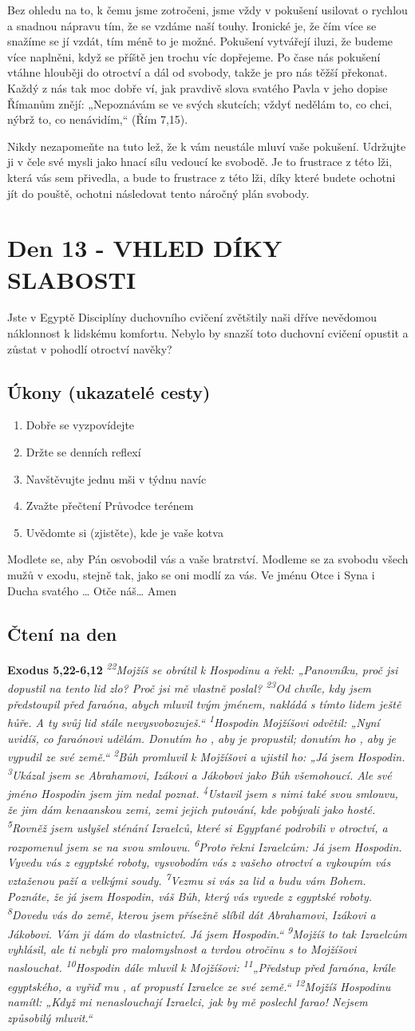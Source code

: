\documentclass[11pt]{article}
\newcommand{\zacatekDruhyTyden}{
  Jste v Egyptě \newline
  Disciplíny duchovního cvičení zvětštily naši dříve nevědomou náklonnost k lidskému komfortu.
  Nebylo by snazší toto duchovní cvičení opustit a zůstat v pohodlí otroctví navěky?

  \subsection*{Úkony (ukazatelé cesty)}
\begin{enumerate}
  \item Dobře se vyzpovídejte
  \item Držte se denních reflexí
  \item Navštěvujte jednu mši v týdnu navíc
  \item Zvažte přečtení Průvodce terénem
  \item Uvědomte si (zjistěte), kde je vaše kotva
\end{enumerate}
Modlete se, aby Pán osvobodil vás a vaše bratrství. \newline
Modleme se za svobodu všech mužů v exodu, stejně tak, jako se oni modlí za vás.\newline
Ve jménu Otce i Syna i Ducha svatého …  Otče náš… Amen
}
\begin{document}
Bez ohledu na to, k čemu jsme zotročeni, jsme vždy v pokušení usilovat o rychlou a snadnou nápravu tím, že se
vzdáme naší touhy. Ironické je, že čím více se snažíme se jí vzdát, tím méně to je možné. Pokušení vytvářejí iluzi,
že budeme více naplněni, když se příště jen trochu víc dopřejeme. Po čase nás pokušení vtáhne hlouběji do otroctví
a dál od svobody, takže je pro nás těžší překonat. Každý z nás tak moc dobře ví, jak pravdivě slova svatého Pavla v
jeho dopise Římanům znějí: „Nepoznávám se ve svých skutcích; vždyť nedělám to, co chci, nýbrž to, co
nenávidím,“ (Řím 7,15).

Nikdy nezapomeňte na tuto lež, že k vám neustále mluví vaše pokušení. Udržujte ji v čele své mysli jako hnací sílu
vedoucí ke svobodě. Je to frustrace z této lži, která vás sem přivedla, a bude to frustrace z této lži, díky které budete
ochotni jít do pouště, ochotni následovat tento náročný plán svobody.

\newpage
\section{Den 13 - VHLED DÍKY SLABOSTI}
\zacatekDruhyTyden
\subsection*{Čtení na den}
\textbf{Exodus 5,22-6,12}
\newline
\textit{
\textsuperscript{22}Mojžíš se obrátil k Hospodinu a řekl: „Panovníku, proč jsi dopustil na tento lid zlo? Proč jsi mě vlastně poslal?
\textsuperscript{23}Od chvíle, kdy jsem předstoupil před faraóna, abych mluvil tvým jménem, nakládá s tímto lidem ještě hůře. A ty svůj lid stále nevysvobozuješ.“
\textsuperscript{1}Hospodin Mojžíšovi odvětil: „Nyní uvidíš, co faraónovi udělám. Donutím ho , aby je propustil; donutím ho , aby je vypudil ze své země.“
\textsuperscript{2}Bůh promluvil k Mojžíšovi a ujistil ho: „Já jsem Hospodin.
\textsuperscript{3}Ukázal jsem se Abrahamovi, Izákovi a Jákobovi jako Bůh všemohoucí. Ale své jméno Hospodin jsem jim nedal poznat.
\textsuperscript{4}Ustavil jsem s nimi také svou smlouvu, že jim dám kenaanskou zemi, zemi jejich putování, kde pobývali jako hosté.
\textsuperscript{5}Rovněž jsem uslyšel sténání Izraelců, které si Egypťané podrobili v otroctví, a rozpomenul jsem se na svou smlouvu.
\textsuperscript{6}Proto řekni Izraelcům: Já jsem Hospodin. Vyvedu vás z egyptské roboty, vysvobodím vás z vašeho otroctví a vykoupím vás vztaženou paží a velkými soudy.
\textsuperscript{7}Vezmu si vás za lid a budu vám Bohem. Poznáte, že já jsem Hospodin, váš Bůh, který vás vyvede z egyptské roboty.
\textsuperscript{8}Dovedu vás do země, kterou jsem přísežně slíbil dát Abrahamovi, Izákovi a Jákobovi. Vám ji dám do vlastnictví. Já jsem Hospodin.“
\textsuperscript{9}Mojžíš to tak Izraelcům vyhlásil, ale ti nebyli pro malomyslnost a tvrdou otročinu s to Mojžíšovi naslouchat.
\textsuperscript{10}Hospodin dále mluvil k Mojžíšovi:
\textsuperscript{11}„Předstup před faraóna, krále egyptského, a vyřiď mu , ať propustí Izraelce ze své země.“
\textsuperscript{12}Mojžíš Hospodinu namítl: „Když mi nenaslouchají Izraelci, jak by mě poslechl farao! Nejsem způsobilý mluvit.“
}
\end{document}
